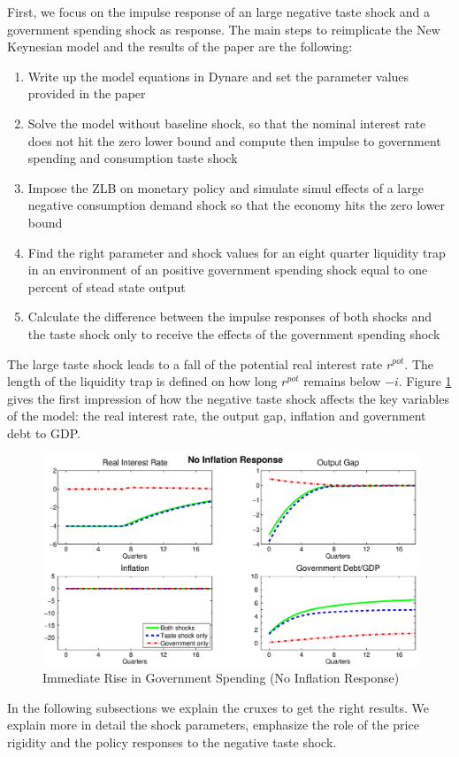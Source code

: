 \documentclass[12pt,a4paper,oneside,titlepage]{article}
\begin{document}
First, we focus on the impulse response of an large negative taste shock and a government spending shock as response.
The main steps to reimplicate the New Keynesian model and the results of the \citet{Erceg.2014} paper are the following:
\begin{enumerate}
\item Write up the model equations in Dynare and set the parameter values provided in the paper\vspace{-0.3cm}
\item Solve the model without baseline shock, so that the nominal interest rate does not hit the zero lower bound and compute then impulse to government spending and consumption taste shock\vspace{-0.3cm}
\item Impose the ZLB on monetary policy and simulate simul effects of a large negative consumption demand shock so that the economy hits the zero lower bound\vspace{-0.3cm}
\item Find the right parameter and shock values for an eight quarter liquidity trap in an environment of an positive government spending shock equal to one percent of stead state output\vspace{-0.3cm}
\item Calculate the difference between the impulse responses of both shocks and the taste shock only to receive the effects of the government spending shock
\end{enumerate}
The large taste shock leads to a fall of the potential real interest rate $r^{pot}$. The length of the liquidity trap is defined on how long $r^{pot}$ remains below $-i$.
Figure \ref{IRnoinflation} gives the first impression of how the negative taste shock affects the key variables of the model: the real interest rate, the output gap, inflation and government debt to GDP.
\begin{figure}[p]
\includegraphics[width=\textwidth]{Paperpics/Figure2noIR}
\caption{Immediate Rise in Government Spending (No Inflation Response)}
\label{IRnoinflation}
\end{figure}
In the following subsections we explain the cruxes to get the right results. We explain more in detail the shock parameters, emphasize the role of the price rigidity and the policy responses to the negative taste shock.
\end{document}
